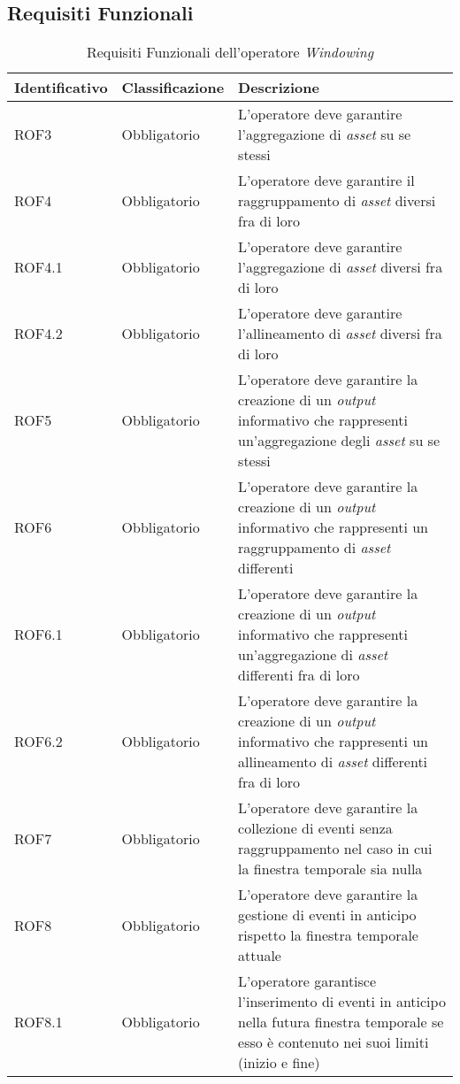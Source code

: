 \subsection{Requisiti Funzionali}
{
\centering
\begin{longtable}{L{3cm} L{3cm} L{7.5cm}}
\caption{Requisiti Funzionali dell'operatore \textit{Windowing}}\\
\textbf{Identificativo} &
\textbf{Classificazione}&
\textbf{Descrizione}\\
\endhead
\hline

ROF3 & Obbligatorio & L'operatore deve garantire l'aggregazione di \textit{asset} su se stessi\\
\hline
ROF4 & Obbligatorio & L'operatore deve garantire il raggruppamento di \textit{asset} diversi fra di loro\\
\hline
ROF4.1 & Obbligatorio & L'operatore deve garantire l'aggregazione di \textit{asset} diversi fra di loro\\
\hline
ROF4.2 & Obbligatorio & L'operatore deve garantire l'allineamento di \textit{asset} diversi fra di loro\\
\hline
ROF5 & Obbligatorio & L'operatore deve garantire la creazione di un \textit{output} informativo che rappresenti un'aggregazione degli \textit{asset} su se stessi\\
\hline
ROF6 & Obbligatorio & L'operatore deve garantire la creazione di un \textit{output} informativo che rappresenti un raggruppamento di \textit{asset} differenti\\
\hline
ROF6.1 & Obbligatorio & L'operatore deve garantire la creazione di un \textit{output} informativo che rappresenti un'aggregazione di \textit{asset} differenti fra di loro\\
\hline
ROF6.2 & Obbligatorio & L'operatore deve garantire la creazione di un \textit{output} informativo che rappresenti un allineamento di \textit{asset} differenti fra di loro\\
\hline
ROF7 & Obbligatorio & L'operatore deve garantire la collezione di eventi senza raggruppamento nel caso in cui la finestra temporale sia nulla\\
\hline
ROF8 & Obbligatorio & L'operatore deve garantire la gestione di eventi in anticipo rispetto la finestra temporale attuale\\
\hline
ROF8.1 & Obbligatorio & L'operatore garantisce l'inserimento di eventi in anticipo nella futura finestra temporale se esso è contenuto nei suoi limiti (inizio e fine)\\

\end{longtable}}

